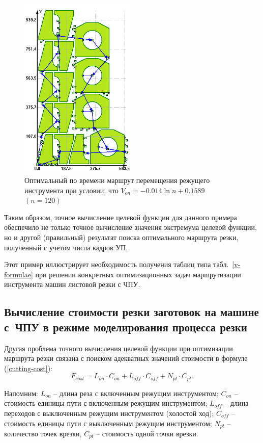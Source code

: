 \documentclass[11pt,twoside,openany]{report}
\begin{document}
\begin{figure}[h]
  \begin{center}
  \includegraphics[width=0.5\textwidth]{amg-optimal.png}
  \caption{
    Оптимальный по времени маршрут
    перемещения режущего инструмента при условии,
    что
    $V_{on}=-0.014 \ln n + 0.1589$
    $(n=120)$
  }
  \label{amg-optimal}
  \end{center}
\end{figure}

Таким образом,
точное вычисление целевой функции для
данного примера обеспечило не только
точное вычисление значения экстремума
целевой функции, но и другой (правильный)
результат поиска оптимального маршрута резки,
полученный  с учетом числа кадров УП.

Этот пример иллюстрирует необходимость
получения таблиц типа табл.~\ref{v-formulae}
при решении конкретных оптимизационных задач
маршрутизации инструмента машин листовой резки с ЧПУ.

{\raggedright\subsection{
  Вычисление стоимости резки заготовок
  на машине с~ЧПУ в режиме моделирования процесса резки
}}

Другая проблема точного вычисления целевой функции
при оптимизации маршрута резки связана
с поиском адекватных значений стоимости в формуле (\ref{cutting-cost}):
$$
F_{cost}=
L_{on} \cdot C_{on} +
L_{off} \cdot C_{off} +
N_{pt} \cdot C_{pt}
.
$$

Напомним:
$L_{on}$ – длина реза с включенным режущим инструментом;
$C_{on}$ – стоимость единицы пути с включенным режущим инструментом;
$L_{off}$ – длина переходов с выключенным режущим инструментом (холостой ход);
$C_{off}$ – стоимость единицы пути с выключенным режущим инструментом;
$N_{pt}$ – количество точек врезки,
$C_{pt}$ – стоимость одной точки врезки.
\end{document}
